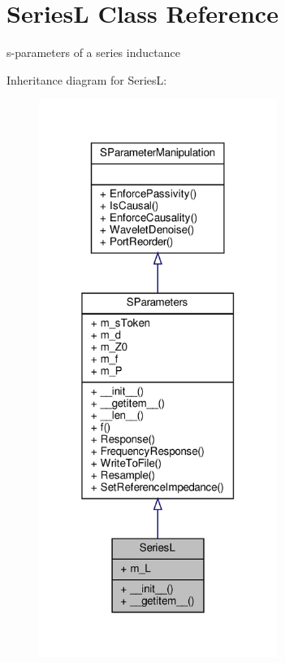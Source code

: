 \hypertarget{classSignalIntegrity_1_1SParameters_1_1Devices_1_1SeriesL_1_1SeriesL}{}\section{SeriesL Class Reference}
\label{classSignalIntegrity_1_1SParameters_1_1Devices_1_1SeriesL_1_1SeriesL}


s-\/parameters of a series inductance  




Inheritance diagram for SeriesL\+:\nopagebreak
\begin{figure}[H]
\begin{center}
\leavevmode
\includegraphics[width=220pt]{classSignalIntegrity_1_1SParameters_1_1Devices_1_1SeriesL_1_1SeriesL__inherit__graph}
\end{center}
\end{figure}



